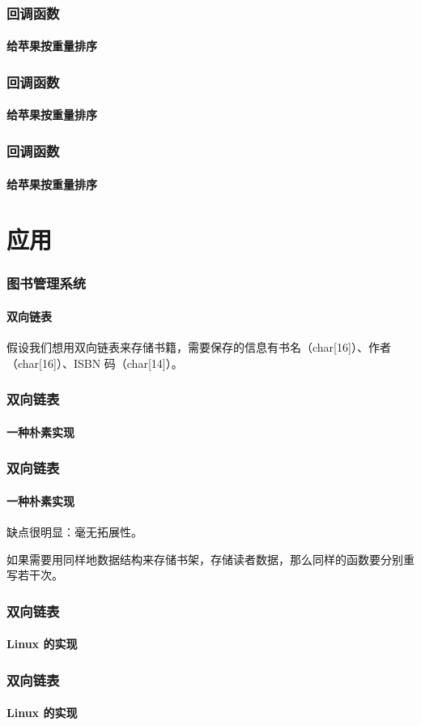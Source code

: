 \documentclass{beamer}
\begin{document}
\begin{frame}
 \frametitle{回调函数}
 \framesubtitle{给苹果按重量排序}

 
\end{frame}

\begin{frame}
 \frametitle{回调函数}
 \framesubtitle{给苹果按重量排序}

 
\end{frame}

\begin{frame}
 \frametitle{回调函数}
 \framesubtitle{给苹果按重量排序}

 
\end{frame}

\section{应用}
\begin{frame}
  \frametitle{图书管理系统}
  \framesubtitle{双向链表}

  假设我们想用双向链表来存储书籍，需要保存的信息有书名（char[16]）、作者（char[16]）、ISBN 码（char[14]）。

\end{frame}

\begin{frame}
  \frametitle{双向链表}
  \framesubtitle{一种朴素实现}

  

\end{frame}

\begin{frame}
  \frametitle{双向链表}
  \framesubtitle{一种朴素实现}

  缺点很明显：毫无拓展性。

  如果需要用同样地数据结构来存储书架，存储读者数据，那么同样的函数要分别重写若干次。

\end{frame}

\begin{frame}
  \frametitle{双向链表}
  \framesubtitle{Linux 的实现}
  
\end{frame}

\begin{frame}
  \frametitle{双向链表}
  \framesubtitle{Linux 的实现}
  
  
\end{frame}
\end{document}

